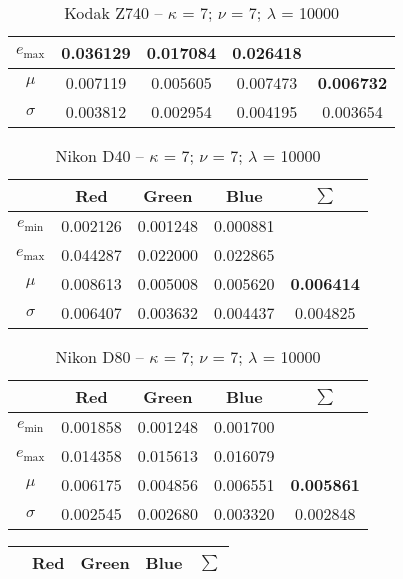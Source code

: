 \begin{appendix}
\begin{table}[htb]
\begin{tabular}{|c||c|c|c|c|}
      $e_\text{max}$ & 0.036129 & 0.017084 & 0.026418 &   \\\hline
      $\mu$          & 0.007119 & 0.005605 & 0.007473 & \textbf{0.006732} \\\hline
      $\sigma$       & 0.003812 & 0.002954 & 0.004195 & 0.003654 \\\hline
    \end{tabular}
  \caption{Kodak Z740 -- $\kappa$ = 7; $\nu$ = 7; $\lambda$ = 10000}
  \label{tab:Kodak Z7407710000}
\end{table}
\begin{table}[htb]
  \centering
    \begin{tabular}{|c||c|c|c|c|}\hline
		   & \textbf{Red} & \textbf{Green} & \textbf{Blue} & \textbf{$\sum$} \\\hline\hline
      $e_\text{min}$ & 0.002126 & 0.001248 & 0.000881 &   \\\hline
      $e_\text{max}$ & 0.044287 & 0.022000 & 0.022865 &   \\\hline
      $\mu$          & 0.008613 & 0.005008 & 0.005620 & \textbf{0.006414} \\\hline
      $\sigma$       & 0.006407 & 0.003632 & 0.004437 & 0.004825 \\\hline
    \end{tabular}
  \caption{Nikon D40 -- $\kappa$ = 7; $\nu$ = 7; $\lambda$ = 10000}
  \label{tab:Nikon D407710000}
\end{table}
\begin{table}[htb]
  \centering
    \begin{tabular}{|c||c|c|c|c|}\hline
		   & \textbf{Red} & \textbf{Green} & \textbf{Blue} & \textbf{$\sum$} \\\hline\hline
      $e_\text{min}$ & 0.001858 & 0.001248 & 0.001700 &   \\\hline
      $e_\text{max}$ & 0.014358 & 0.015613 & 0.016079 &   \\\hline
      $\mu$          & 0.006175 & 0.004856 & 0.006551 & \textbf{0.005861} \\\hline
      $\sigma$       & 0.002545 & 0.002680 & 0.003320 & 0.002848 \\\hline
    \end{tabular}
  \caption{Nikon D80 -- $\kappa$ = 7; $\nu$ = 7; $\lambda$ = 10000}
  \label{tab:Nikon D807710000}
\end{table}
\begin{table}[htb]
  \centering
    \begin{tabular}{|c||c|c|c|c|}\hline
		   & \textbf{Red} & \textbf{Green} & \textbf{Blue} & \textbf{$\sum$} \\\hline\hline

\end{tabular}
\end{table}
\end{appendix}
